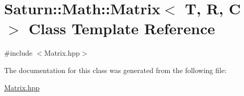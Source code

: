 \hypertarget{class_saturn_1_1_math_1_1_matrix}{}\section{Saturn\+:\+:Math\+:\+:Matrix$<$ T, R, C $>$ Class Template Reference}
\label{class_saturn_1_1_math_1_1_matrix}


{\ttfamily \#include $<$Matrix.\+hpp$>$}



The documentation for this class was generated from the following file\+:\begin{DoxyCompactItemize}
\item 
\mbox{\hyperlink{_matrix_8hpp}{Matrix.\+hpp}}\end{DoxyCompactItemize}
